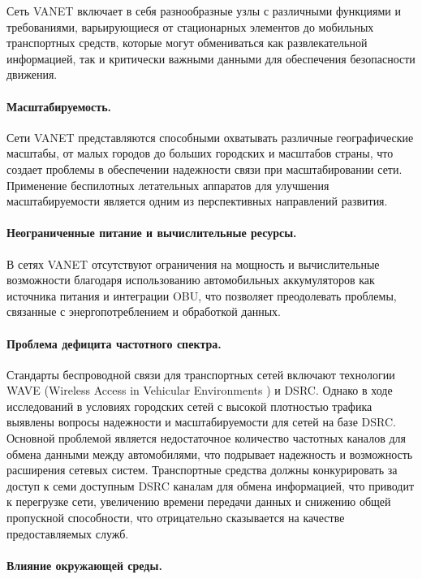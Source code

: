 Сеть VANET включает в себя разнообразные узлы с различными функциями и требованиями, варьирующиеся от стационарных элементов до мобильных транспортных средств, которые могут обмениваться как развлекательной информацией, так и критически важными данными для обеспечения безопасности движения.

\paragraph{Масштабируемость.}

Сети VANET представляются способными охватывать различные географические масштабы, от малых городов до больших городских и масштабов страны, что создает проблемы в обеспечении надежности связи при масштабировании сети. Применение беспилотных летательных аппаратов для улучшения масштабируемости является одним из перспективных направлений развития.

\paragraph{Неограниченные питание и вычислительные ресурсы.}

В сетях VANET отсутствуют ограничения на мощность и вычислительные возможности благодаря использованию автомобильных аккумуляторов как источника питания и интеграции OBU, что позволяет преодолевать проблемы, связанные с энергопотреблением и обработкой данных.

\paragraph{Проблема дефицита частотного спектра.}

Стандарты беспроводной связи для транспортных сетей включают технологии WAVE (Wireless Access in Vehicular Environments ) и DSRC. Однако в ходе исследований в условиях городских сетей с высокой плотностью трафика выявлены вопросы надежности и масштабируемости для сетей на базе DSRC. Основной проблемой является недостаточное количество частотных каналов для обмена данными между автомобилями, что подрывает надежность и возможность расширения сетевых систем. Транспортные средства должны конкурировать за доступ к семи доступным DSRC каналам для обмена информацией, что приводит к перегрузке сети, увеличению времени передачи данных и снижению общей пропускной способности, что отрицательно сказывается на качестве предоставляемых служб.

\paragraph{Влияние окружающей среды.}


